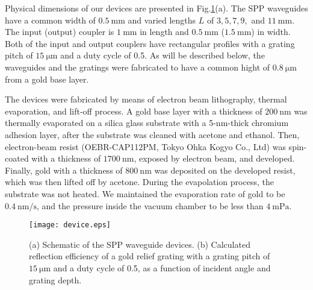 \documentclass[aip,apl,reprint]{revtex4-1}
\begin{document}
Physical dimensions of our devices are presented in Fig.\ref{fig:device}(a).  The SPP waveguides have a common width of $0.5\:\mathrm{mm}$ and varied lengths $L$ of $3, 5, 7, 9,$ and $11\:\mathrm{mm}$. The input (output) coupler is $1\:\mathrm{mm}$ in length and $0.5\:\mathrm{mm}$ ($1.5\:\mathrm{mm}$) in width. Both of the input and output couplers have rectangular profiles with a grating pitch of $15\:\mathrm{\mu m}$ and a duty cycle of 0.5. As will be described below, the waveguides and the gratings were fabricated to have a common hight of $0.8\:\mathrm{\mu m}$ from a gold base layer.

The devices were fabricated by means of electron beam lithography, thermal evaporation, and lift-off process. A gold base layer with a thickness of $200\:\mathrm{nm}$ was thermally evaporated on a silica glass substrate with a 5-nm-thick chromium adhesion layer, after the substrate was cleaned with acetone and ethanol. Then, electron-beam resist (OEBR-CAP112PM, Tokyo Ohka Kogyo Co., Ltd) was spin-coated with a thickness of $1700\:\mathrm{nm}$, exposed by electron beam, and developed. Finally, gold with a thickness of $800\:\mathrm{nm}$ was deposited on the developed resist, which was then lifted off by acetone. During the evapolation process, the substrate was not heated. We maintained the evaporation rate of gold to be $0.4\:\mathrm{nm/s}$, and the pressure inside the vacuum chamber to be less than $4\:\mathrm{mPa}$.

 \begin{figure}
    \texttt{[image: device.eps]}
    \caption{(a) Schematic of the SPP waveguide devices. (b) Calculated reflection efficiency of a gold relief grating with a grating pitch of $15\:\mathrm{\mu m}$ and a duty cycle of 0.5, as a function of incident angle and grating depth.}
     \label{fig:device}
\end{figure}
\end{document}
